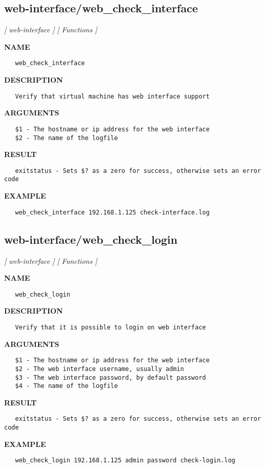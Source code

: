 \subsection{web-interface/web\_check\_interface}
\textsl{[ web-interface ]}
\textsl{[ Functions ]}

\label{ch:robo46}
\label{ch:web_interface_web_check_interface}
\textbf{NAME}
\begin{verbatim}
   web_check_interface
\end{verbatim}
\textbf{DESCRIPTION}
\begin{verbatim}
   Verify that virtual machine has web interface support
\end{verbatim}
\textbf{ARGUMENTS}
\begin{verbatim}
   $1 - The hostname or ip address for the web interface
   $2 - The name of the logfile
\end{verbatim}
\textbf{RESULT}
\begin{verbatim}
   exitstatus - Sets $? as a zero for success, otherwise sets an error code
\end{verbatim}
\textbf{EXAMPLE}
\begin{verbatim}
   web_check_interface 192.168.1.125 check-interface.log
\end{verbatim}
\newpage
\subsection{web-interface/web\_check\_login}
\textsl{[ web-interface ]}
\textsl{[ Functions ]}

\label{ch:robo47}
\label{ch:web_interface_web_check_login}
\textbf{NAME}
\begin{verbatim}
   web_check_login
\end{verbatim}
\textbf{DESCRIPTION}
\begin{verbatim}
   Verify that it is possible to login on web interface
\end{verbatim}
\textbf{ARGUMENTS}
\begin{verbatim}
   $1 - The hostname or ip address for the web interface
   $2 - The web interface username, usually admin
   $3 - The web interface password, by default password
   $4 - The name of the logfile
\end{verbatim}
\textbf{RESULT}
\begin{verbatim}
   exitstatus - Sets $? as a zero for success, otherwise sets an error code
\end{verbatim}
\textbf{EXAMPLE}
\begin{verbatim}
   web_check_login 192.168.1.125 admin password check-login.log
\end{verbatim}
\newpage
